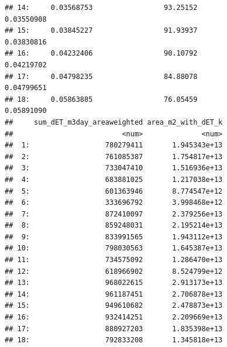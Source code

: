 \documentclass[
  11pt,
]{article}
\begin{document}
\begin{verbatim}
## 14:     0.03568753                 93.25152                  0.03550908
## 15:     0.03845227                 91.93937                  0.03830816
## 16:     0.04232406                 90.10792                  0.04219702
## 17:     0.04798235                 84.88078                  0.04799651
## 18:     0.05863885                 76.05459                  0.05891090
##     sum_dET_m3day_areaweighted area_m2_with_dET_k
##                          <num>              <num>
##  1:                  780279411       1.945343e+13
##  2:                  761085387       1.754817e+13
##  3:                  733047410       1.516936e+13
##  4:                  683881025       1.217038e+13
##  5:                  601363946       8.774547e+12
##  6:                  333696792       3.998468e+12
##  7:                  872410097       2.379256e+13
##  8:                  859248031       2.195214e+13
##  9:                  833991565       1.943112e+13
## 10:                  798030563       1.645387e+13
## 11:                  734575092       1.286470e+13
## 12:                  618966902       8.524799e+12
## 13:                  968022615       2.913173e+13
## 14:                  961187451       2.706878e+13
## 15:                  949610682       2.478873e+13
## 16:                  932414251       2.209669e+13
## 17:                  880927203       1.835398e+13
## 18:                  792833208       1.345818e+13
\end{verbatim}
\end{document}
